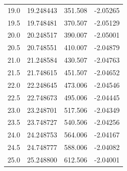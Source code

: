 {{\begin{tabular}{ m{4em} m{4em}  m{4em}  m{4em} }
			19.0 & 19.248443 & 351.508 & -2.05265 \\[-1em]
			19.5 & 19.748481 & 370.507 &  -2.05129 \\[-1em]
			20.0 & 20.248517 & 390.007 &  -2.05001 \\[-1em]
			20.5 & 20.748551 & 410.007 &  -2.04879 \\[-1em]
			21.0 & 21.248584 & 430.507 &  -2.04763 \\[-1em]
			21.5 & 21.748615 & 451.507 &  -2.04652 \\[-1em]
			22.0 & 22.248645 & 473.006 &  -2.04546 \\[-1em]
			22.5 & 22.748673 & 495.006 &  -2.04445 \\[-1em]
			23.0 & 23.248701 & 517.506 &  -2.04349 \\[-1em]
			23.5 & 23.748727 & 540.506 &  -2.04256 \\[-1em]
			24.0 & 24.248753 & 564.006 &  -2.04167 \\[-1em]
			24.5 & 24.748777 & 588.006 &  -2.04082 \\[-1em]
			25.0 & 25.248800 & 612.506 &   -2.04001 \\
			\hline
		\end{tabular}
	}
	\restoregeometry
}


